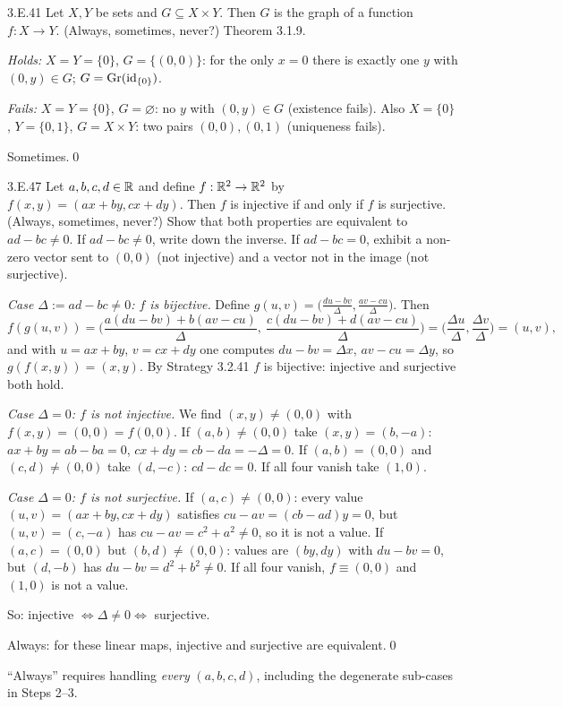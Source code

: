 \begin{bookex}[essential]{3.E.41}
Let $X,Y$ be sets and $G\subseteq X\times Y$. Then $G$ is the graph of a function $f:X\to Y$. (Always, sometimes, never?)
\solution
\given Theorem 3.1.9.
\begin{steps}
\item \emph{Holds:} $X=Y=\{0\}$, $G=\{(0,0)\}$: for the only $x=0$ there is exactly one $y$ with $(0,y)\in G$; $G=\mathrm{Gr}(\mathrm{id}_{\{0\}})$.
\item \emph{Fails:} $X=Y=\{0\}$, $G=\varnothing$: no $y$ with $(0,y)\in G$ (existence fails). Also $X=\{0\}$, $Y=\{0,1\}$, $G=X\times Y$: two pairs $(0,0),(0,1)$ (uniqueness fails).
\end{steps}
\conclusion Sometimes.\qed
\end{bookex}

\begin{bookex}[recommended]{3.E.47}
Let $a,b,c,d\in\mathbb{R}$ and define $f:\mathbb{R}^2\to\mathbb{R}^2$ by $f(x,y)=(ax+by,cx+dy)$. Then $f$ is injective if and only if $f$ is surjective. (Always, sometimes, never?)
\solution
\plan Show that both properties are equivalent to $ad-bc\ne0$. If $ad-bc\ne0$, write down the inverse. If $ad-bc=0$, exhibit a non-zero vector sent to $(0,0)$ (not injective) and a vector not in the image (not surjective).
\begin{steps}
\item \emph{Case $\Delta:=ad-bc\ne0$: $f$ is bijective.} Define $g(u,v)=\big(\frac{du-bv}\Delta,\frac{av-cu}\Delta\big)$. Then
\[
f(g(u,v))=\Big(\frac{a(du-bv)+b(av-cu)}\Delta,\ \frac{c(du-bv)+d(av-cu)}\Delta\Big)=\Big(\frac{\Delta u}\Delta,\frac{\Delta v}\Delta\Big)=(u,v),
\]
and with $u=ax+by$, $v=cx+dy$ one computes $du-bv=\Delta x$, $av-cu=\Delta y$, so $g(f(x,y))=(x,y)$. By Strategy 3.2.41 $f$ is bijective: injective and surjective both hold.
\item \emph{Case $\Delta=0$: $f$ is not injective.} We find $(x,y)\ne(0,0)$ with $f(x,y)=(0,0)=f(0,0)$. If $(a,b)\ne(0,0)$ take $(x,y)=(b,-a)$: $ax+by=ab-ba=0$, $cx+dy=cb-da=-\Delta=0$. If $(a,b)=(0,0)$ and $(c,d)\ne(0,0)$ take $(d,-c)$: $cd-dc=0$. If all four vanish take $(1,0)$.
\item \emph{Case $\Delta=0$: $f$ is not surjective.} If $(a,c)\ne(0,0)$: every value $(u,v)=(ax+by,cx+dy)$ satisfies $cu-av=(cb-ad)y=0$, but $(u,v)=(c,-a)$ has $cu-av=c^2+a^2\ne0$, so it is not a value. If $(a,c)=(0,0)$ but $(b,d)\ne(0,0)$: values are $(by,dy)$ with $du-bv=0$, but $(d,-b)$ has $du-bv=d^2+b^2\ne0$. If all four vanish, $f\equiv(0,0)$ and $(1,0)$ is not a value.
\item So: injective $\Leftrightarrow\Delta\ne0\Leftrightarrow$ surjective.
\end{steps}
\conclusion Always: for these linear maps, injective and surjective are equivalent.\qed
\begin{compare}
\item ``Always'' requires handling \emph{every} $(a,b,c,d)$, including the degenerate sub-cases in Steps 2--3.
\end{compare}
\end{bookex}

